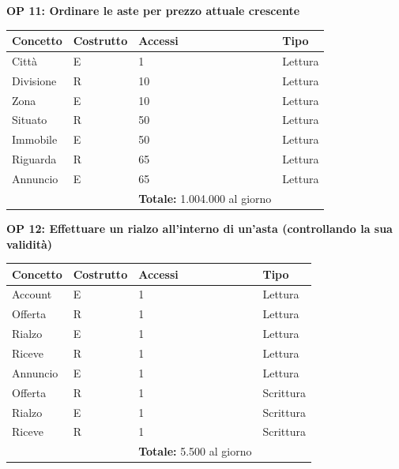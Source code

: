 \documentclass[a4paper,12pt]{report}
\begin{document}
            \textbf{OP 11: Ordinare le aste per prezzo attuale crescente}
        	\begin{table}[H]
            \centering
             \begin{tabular}{llll}
             \rowcolor{yellow!20} \textbf{Concetto} & \textbf{Costrutto} & \textbf{Accessi} & \textbf{Tipo}\\ [0.5ex] 
             \hline
             Città & E & 1 & Lettura \\ 
             Divisione & R & 10 & Lettura \\ 
             Zona & E & 10 & Lettura \\ 
             Situato & R & 50 & Lettura \\ 
             Immobile & E & 50 & Lettura \\ 
             Riguarda & R & 65 & Lettura \\ 
             Annuncio & E & 65 & Lettura \\ 
             \hline
                \rowcolor{yellow!20} &   & \textbf{Totale:}  1.004.000 al giorno &  \\ [1ex] 
             
             \end{tabular}
            \end{table}

            \textbf{OP 12: Effettuare un rialzo all’interno di un’asta (controllando la sua validità)}
        	\begin{table}[H]
            \centering
             \begin{tabular}{llll}
             \rowcolor{yellow!20} \textbf{Concetto} & \textbf{Costrutto} & \textbf{Accessi} & \textbf{Tipo}\\ [0.5ex] 
             \hline
             Account & E & 1 & Lettura \\ 
             Offerta & R & 1 & Lettura \\ 
             Rialzo & E & 1 & Lettura \\ 
             Riceve & R & 1 & Lettura \\ 
             Annuncio & E & 1 & Lettura \\ 
             Offerta & R & 1 & Scrittura \\ 
             Rialzo & E & 1 & Scrittura \\ 
             Riceve & R & 1 & Scrittura \\ 
             \hline
                \rowcolor{yellow!20} &   & \textbf{Totale:}  5.500 al giorno &  \\ [1ex] 
             
             \end{tabular}
            \end{table}
\end{document}
